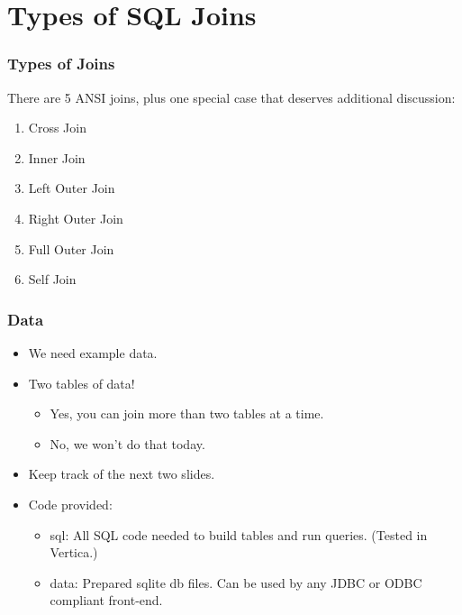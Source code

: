 \documentclass{beamer}
\begin{document}
\section{Types of SQL Joins} %

\begin{frame}
  \frametitle{Types of Joins}

  There are 5 ANSI joins, plus one special case that
  deserves additional discussion:

  \begin{enumerate}
  \item Cross Join
  \item Inner Join
  \item Left Outer Join
  \item Right Outer Join
  \item Full Outer Join
  \item Self Join
  \end{enumerate}
\end{frame}  

\begin{frame}
  \frametitle{Data}

  \begin{itemize}
  \item We need example data.
  \item Two tables of data!
    \begin{itemize}
    \item Yes, you can join more than two tables at a time.
    \item No, we won't do that today.
    \end{itemize}
  \item Keep track of the next two slides.
  \item Code provided:
    \begin{itemize}
    \item sql: All SQL code needed to build tables and run
      queries. (Tested in Vertica.)
    \item data: Prepared sqlite db files. Can be used by any JDBC or
      ODBC compliant front-end.
    \end{itemize}
  \end{itemize}
 
\end{frame}
\end{document}
